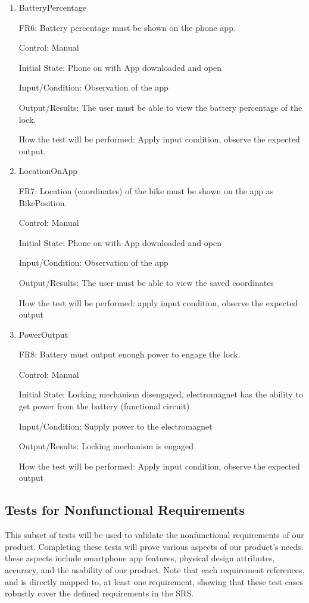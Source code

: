 \documentclass[12pt, titlepage]{article}
\begin{document}
\begin{enumerate}

\item{BatteryPercentage

FR6: Battery percentage must be shown on the phone app. }

Control: Manual 

Initial State: Phone on with App downloaded and open 

Input/Condition: Observation of the app

Output/Results: The user must be able to view the battery percentage of the lock.

How the test will be performed: Apply input condition, observe the expected output.

\item{LocationOnApp

FR7: Location (coordinates) of the bike must be shown on the app as BikePosition.}

Control: Manual 

Initial State: Phone on with App downloaded and open 

Input/Condition: Observation of the app 

Output/Results: The user must be able to view the saved coordinates 

How the test will be performed: apply input condition, observe the expected output

\item{PowerOutput

FR8: Battery must output enough power to engage the lock. }

Control: Manual 

Initial State: Locking mechanism disengaged, electromagnet has the ability to get power from the battery (functional circuit) 

Input/Condition: Supply power to the electromagnet 

Output/Results: Locking mechanism is engaged 

How the test will be performed: Apply input condition, observe the expected output

\end{enumerate}

\subsection{Tests for Nonfunctional Requirements}
\label{Section 5.2}

This subset of tests will be used to validate the nonfunctional requirements of our product. Completing these tests will prove various aspects of our product's needs. these aspects include smartphone app features, physical design attributes, accuracy, and the usability of our product. Note that each requirement references, and is directly mapped to, at least one requirement, showing that these test cases robustly cover the defined requirements in the SRS.
\end{document}
